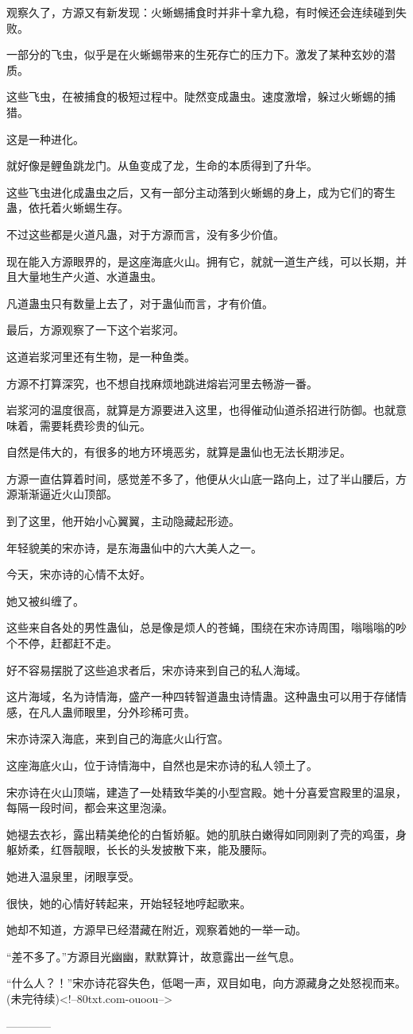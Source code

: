 \begin{this_body}
观察久了，方源又有新发现：火蜥蜴捕食时并非十拿九稳，有时候还会连续碰到失败。

一部分的飞虫，似乎是在火蜥蜴带来的生死存亡的压力下。激发了某种玄妙的潜质。

这些飞虫，在被捕食的极短过程中。陡然变成蛊虫。速度激增，躲过火蜥蜴的捕猎。

这是一种进化。

就好像是鲤鱼跳龙门。从鱼变成了龙，生命的本质得到了升华。

这些飞虫进化成蛊虫之后，又有一部分主动落到火蜥蜴的身上，成为它们的寄生蛊，依托着火蜥蜴生存。

不过这些都是火道凡蛊，对于方源而言，没有多少价值。

现在能入方源眼界的，是这座海底火山。拥有它，就就一道生产线，可以长期，并且大量地生产火道、水道蛊虫。

凡道蛊虫只有数量上去了，对于蛊仙而言，才有价值。

最后，方源观察了一下这个岩浆河。

这道岩浆河里还有生物，是一种鱼类。

方源不打算深究，也不想自找麻烦地跳进熔岩河里去畅游一番。

岩浆河的温度很高，就算是方源要进入这里，也得催动仙道杀招进行防御。也就意味着，需要耗费珍贵的仙元。

自然是伟大的，有很多的地方环境恶劣，就算是蛊仙也无法长期涉足。

方源一直估算着时间，感觉差不多了，他便从火山底一路向上，过了半山腰后，方源渐渐逼近火山顶部。

到了这里，他开始小心翼翼，主动隐藏起形迹。

年轻貌美的宋亦诗，是东海蛊仙中的六大美人之一。

今天，宋亦诗的心情不太好。

她又被纠缠了。

这些来自各处的男性蛊仙，总是像是烦人的苍蝇，围绕在宋亦诗周围，嗡嗡嗡的吵个不停，赶都赶不走。

好不容易摆脱了这些追求者后，宋亦诗来到自己的私人海域。

这片海域，名为诗情海，盛产一种四转智道蛊虫诗情蛊。这种蛊虫可以用于存储情感，在凡人蛊师眼里，分外珍稀可贵。

宋亦诗深入海底，来到自己的海底火山行宫。

这座海底火山，位于诗情海中，自然也是宋亦诗的私人领土了。

宋亦诗在火山顶端，建造了一处精致华美的小型宫殿。她十分喜爱宫殿里的温泉，每隔一段时间，都会来这里泡澡。

她褪去衣衫，露出精美绝伦的白皙娇躯。她的肌肤白嫩得如同刚剥了壳的鸡蛋，身躯娇柔，红唇靓眼，长长的头发披散下来，能及腰际。

她进入温泉里，闭眼享受。

很快，她的心情好转起来，开始轻轻地哼起歌来。

她却不知道，方源早已经潜藏在附近，观察着她的一举一动。

“差不多了。”方源目光幽幽，默默算计，故意露出一丝气息。

“什么人？！”宋亦诗花容失色，低喝一声，双目如电，向方源藏身之处怒视而来。(未完待续)<!--80txt.com-ouoou-->

------------

\end{this_body}

